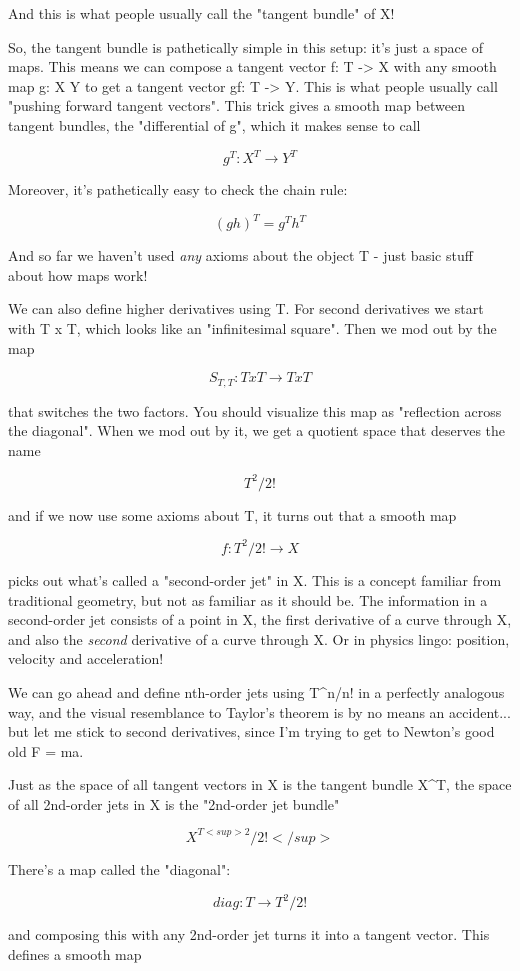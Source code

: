 And this is what people usually call the "tangent bundle" of X!   

So, the tangent bundle is pathetically simple in this setup: it's just
a space of maps.  This means we can compose a tangent vector f: T
-> X with any smooth map g: X \to  Y to get a tangent vector gf: T
-> Y.  This is what people usually call "pushing forward
tangent vectors".  This trick gives a smooth map between tangent
bundles, the "differential of g", which it makes sense to
call

$$
g^{T}: X^{T} \to  Y^{T}
$$
    
Moreover, it's pathetically easy to check the chain rule:

$$
(gh)^{T} = g^{T} h^{T}
$$
    

And so far we haven't used \emph{any} axioms about the object T - just basic 
stuff about how maps work!

We can also define higher derivatives using T.  For second derivatives
we start with T x T, which looks like an "infinitesimal square".  Then
we mod out by the map

$$
S_{T,T}: T x T \to  T x T
$$
    

that switches the two factors.  You should visualize this map as 
"reflection across the diagonal".  When we mod out by it, we get 
a quotient space that deserves the name

$$
T^{2}/2!
$$
    

and if we now use some axioms about T, it turns out that a smooth map

$$
f: T^{2}/2! \to  X
$$
    

picks out what's called a "second-order jet" in X.  This is a concept
familiar from traditional geometry, but not as familiar as it should be.
The information in a second-order jet consists of a point in X, the 
first derivative of a curve through X, and also the \emph{second} derivative 
of a curve through X.   Or in physics lingo: position, velocity and 
acceleration!  

We can go ahead and define nth-order jets using T^{n}/n! in a perfectly
analogous way, and the visual resemblance to Taylor's theorem is by no
means an accident... but let me stick to second derivatives, since I'm
trying to get to Newton's good old F = ma.

Just as the space of all tangent vectors in X is the tangent bundle
X^{T}, the space of all 2nd-order jets in X is the
"2nd-order jet bundle"

$$
X^{T<sup>2}/2!</sup>
$$
    
There's a map called the "diagonal": 

$$
diag: T \to  T^{2}/2! 
$$
    

and composing this with any 2nd-order jet 
turns it into a tangent vector.  This defines
a smooth map



